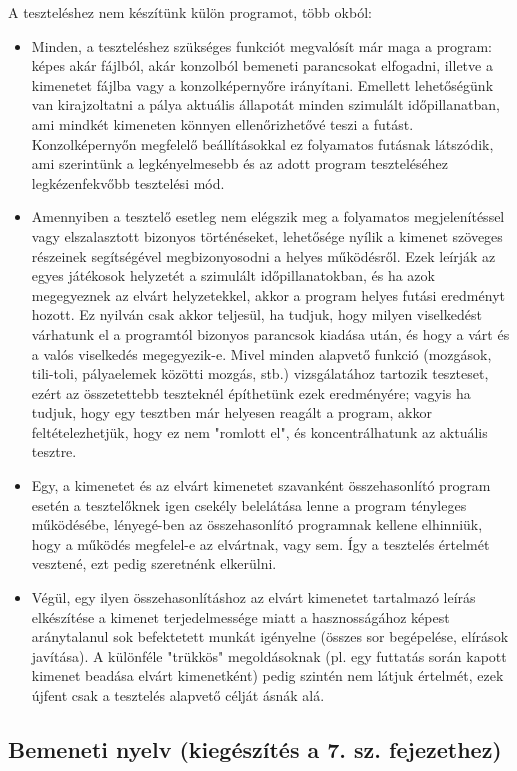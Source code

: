 A teszteléshez nem készítünk külön programot, több okból:
\begin{itemize}
\item Minden, a teszteléshez szükséges funkciót megvalósít már maga a program: képes akár fájlból, akár konzolból bemeneti parancsokat elfogadni, illetve a kimenetet fájlba vagy a konzolképernyőre irányítani. Emellett lehetőségünk van kirajzoltatni a pálya aktuális állapotát minden szimulált időpillanatban, ami mindkét kimeneten könnyen ellenőrizhetővé teszi a futást. Konzolképernyőn megfelelő beállításokkal ez folyamatos futásnak látszódik, ami szerintünk a legkényelmesebb és az adott program teszteléséhez legkézenfekvőbb tesztelési mód.
\item Amennyiben a tesztelő esetleg nem elégszik meg a folyamatos megjelenítéssel vagy elszalasztott bizonyos történéseket, lehetősége nyílik a kimenet szöveges részeinek segítségével megbizonyosodni a helyes működésről. Ezek leírják az egyes játékosok helyzetét a szimulált időpillanatokban, és ha azok megegyeznek az elvárt helyzetekkel, akkor a program helyes futási eredményt hozott. Ez nyilván csak akkor teljesül, ha tudjuk, hogy milyen viselkedést várhatunk el a programtól bizonyos parancsok kiadása után, és hogy a várt és a valós viselkedés megegyezik-e. Mivel minden alapvető funkció (mozgások, tili-toli, pályaelemek közötti mozgás, stb.) vizsgálatához tartozik teszteset, ezért az összetettebb teszteknél építhetünk ezek eredményére; vagyis ha tudjuk, hogy egy tesztben már helyesen reagált a program, akkor feltételezhetjük, hogy ez nem "romlott el", és koncentrálhatunk az aktuális tesztre.
\item Egy, a kimenetet és az elvárt kimenetet szavanként összehasonlító program esetén a tesztelőknek igen csekély belelátása lenne a program tényleges működésébe, lényegé-ben az összehasonlító programnak kellene elhinniük, hogy a működés megfelel-e az elvártnak, vagy sem. Így a tesztelés értelmét vesztené, ezt pedig szeretnénk elkerülni.
\item Végül, egy ilyen összehasonlításhoz az elvárt kimenetet tartalmazó leírás elkészítése a kimenet terjedelmessége miatt a hasznosságához képest aránytalanul sok befektetett munkát igényelne (összes sor begépelése, elírások javítása). A különféle "trükkös" megoldásoknak (pl. egy futtatás során kapott kimenet beadása elvárt kimenetként) pedig szintén nem látjuk értelmét, ezek újfent csak a tesztelés alapvető célját ásnák alá.
\end{itemize}


\subsection{Bemeneti nyelv {\small (kiegészítés a 7. sz. fejezethez)}}

